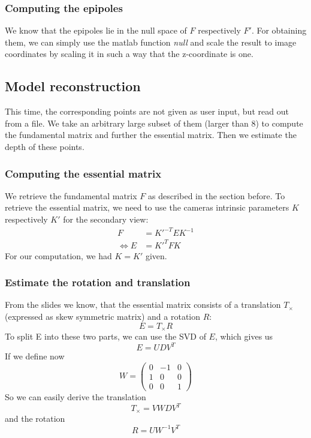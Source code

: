 \documentclass{paper}
\begin{document}
\subsubsection{Computing the epipoles}
We know that the epipoles lie in the null space of $F$ respectively $F'$. For
obtaining them, we can simply use the matlab function \emph{null} and scale 
the result to image coordinates by scaling it in such a way that 
the z-coordinate is one.
 
\subsection{Model reconstruction}
This time, the corresponding points are not given as user input, but
read out from a file. We take an arbitrary large subset of them 
(larger than 8) to compute the fundamental
matrix and further the essential matrix. Then we estimate the depth of these points.

\subsubsection{Computing the essential matrix}
We retrieve the fundamental matrix $F$ as described in the section before. To
retrieve the essential matrix, we need to use the cameras intrinsic parameters $K$ respectively $K'$ for the secondary view:
\begin{align}
	 F &= K'^{-T} E K^{-1} \\
	\Longleftrightarrow E &= K'^T F K
\end{align}
For our computation, we had $K = K'$ given. 
\subsubsection{Estimate the rotation and translation}

From the slides we know, that the essential matrix consists of a translation $T_\times$ (expressed as skew symmetric matrix) and a rotation $R$:
\begin{equation}
	E = T_\times R
\end{equation}
To split E into these two parts, we can use the SVD of $E$, which gives us
\begin{equation}
	E = UDV^T
\end{equation}
If we define now
\begin{equation}
 W = \begin{pmatrix}
 	0 & -1 & 0 \\
 	1 & 0 & 0 \\
 	0 & 0 & 1
 \end{pmatrix}
\end{equation}
So we can easily derive the translation
\begin{equation}
T_\times = V W D V^T
\end{equation}
and the rotation
\begin{equation}
R = U W^{-1} V^T
\end{equation}


\end{document}
